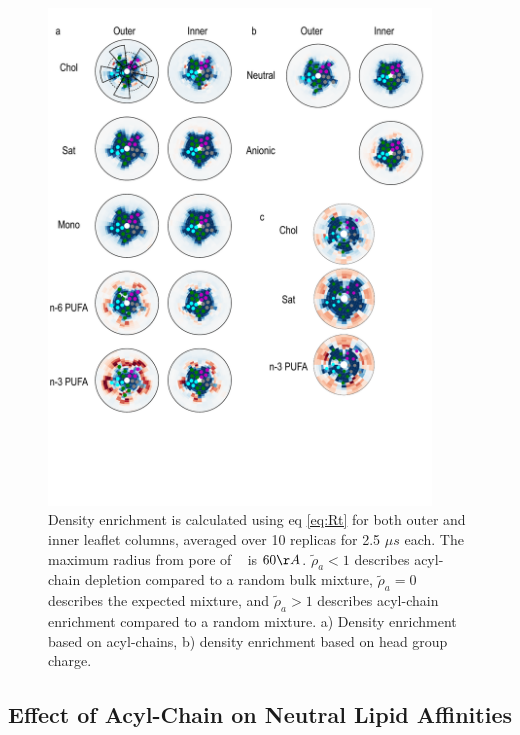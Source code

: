 \begin{figure}[!h]
	\center
	\includegraphics[width=4in]{./Figures/acyl_heatmap.pdf}
	\caption[Model binding areas and acyl-chain density enrichment or depletion around a central singular \nachr.] { Density enrichment is calculated using eq \ref{eq:Rt} for both outer and inner leaflet columns, averaged over 10 replicas for 2.5 $\mu s$ each. The maximum radius from pore of \nachr~ is $60 \AA$. $\tilde{\rho}_{a}< 1$ describes acyl-chain depletion compared to a random bulk mixture, $\tilde{\rho}_{a}=0$ describes the expected mixture, and $\tilde{\rho}_{a}  > 1$ describes acyl-chain enrichment compared to a random mixture. a) Density enrichment based on acyl-chains, b) density enrichment based on head group charge.}
	\label{fig:acyl_map}
\end{figure}

\subsection{Effect of Acyl-Chain on Neutral Lipid Affinities}


